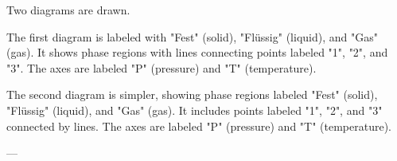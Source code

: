 Two diagrams are drawn.  

The first diagram is labeled with "Fest" (solid), "Flüssig" (liquid), and "Gas" (gas). It shows phase regions with lines connecting points labeled "1", "2", and "3". The axes are labeled "P" (pressure) and "T" (temperature).  

The second diagram is simpler, showing phase regions labeled "Fest" (solid), "Flüssig" (liquid), and "Gas" (gas). It includes points labeled "1", "2", and "3" connected by lines. The axes are labeled "P" (pressure) and "T" (temperature).  

---